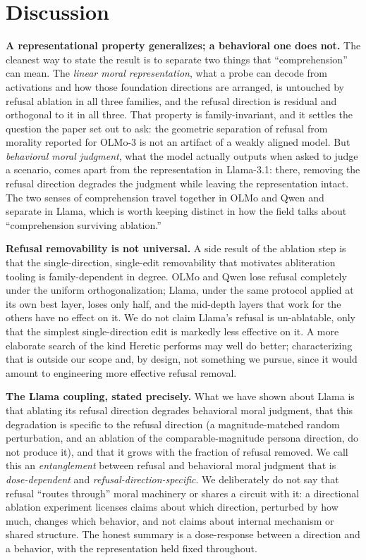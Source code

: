 \section{Discussion}\label{discussion}

\textbf{A representational property generalizes; a behavioral one does not.} The
cleanest way to state the result is to separate two things that ``comprehension''
can mean. The \emph{linear moral representation}, what a probe can decode from
activations and how those foundation directions are arranged, is untouched by
refusal ablation in all three families, and the refusal direction is residual and
orthogonal to it in all three. That property is family-invariant, and it settles
the question the paper set out to ask: the geometric separation of refusal from
morality reported for OLMo-3 is not an artifact of a weakly aligned model. But
\emph{behavioral moral judgment}, what the model actually outputs when asked to judge a
scenario, comes apart from the representation in Llama-3.1: there, removing the
refusal direction degrades the judgment while leaving the representation intact.
The two senses of comprehension travel together in OLMo and Qwen and separate in
Llama, which is worth keeping distinct in how the field talks about ``comprehension
surviving ablation.''

\textbf{Refusal removability is not universal.} A side result of the ablation step is
that the single-direction, single-edit removability that motivates abliteration
tooling is family-dependent in degree. OLMo and Qwen lose refusal completely under
the uniform orthogonalization; Llama, under the same protocol applied at its own
best layer, loses only half, and the mid-depth layers that work for the others
have no effect on it. We do not claim Llama's refusal is un-ablatable, only that
the simplest single-direction edit is markedly less effective on it. A more
elaborate search of the kind Heretic performs may well do better; characterizing
that is outside our scope and, by design, not something we pursue, since it would
amount to engineering more effective refusal removal.

\textbf{The Llama coupling, stated precisely.} What we have shown about Llama is that
ablating its refusal direction degrades behavioral moral judgment, that this
degradation is specific to the refusal direction (a magnitude-matched random
perturbation, and an ablation of the comparable-magnitude persona direction, do
not produce it), and that it grows with the fraction of refusal removed. We call
this an \emph{entanglement} between refusal and behavioral moral judgment that is
\emph{dose-dependent} and \emph{refusal-direction-specific}. We deliberately do not say that
refusal ``routes through'' moral machinery or shares a circuit with it: a
directional ablation experiment licenses claims about which direction, perturbed
by how much, changes which behavior, and not claims about internal mechanism or
shared structure. The honest summary is a dose-response between a direction and a
behavior, with the representation held fixed throughout.

